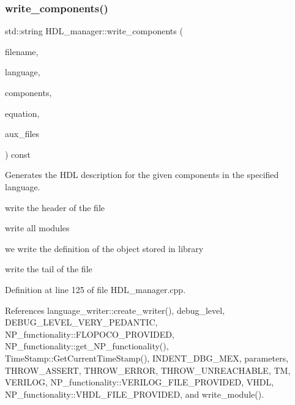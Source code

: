 \subsubsection{\texorpdfstring{write\+\_\+components()}{write\_components()}\hspace{0.1cm}{\footnotesize\ttfamily [1/2]}}
{\footnotesize\ttfamily std\+::string H\+D\+L\+\_\+manager\+::write\+\_\+components (\begin{DoxyParamCaption}\item[{const std\+::string \&}]{filename,  }\item[{const \hyperlink{language__writer_8hpp_a890069761ca3ce361c42684c789d886c}{H\+D\+L\+Writer\+\_\+\+Language}}]{language,  }\item[{const std\+::list$<$ \hyperlink{structural__objects_8hpp_a8ea5f8cc50ab8f4c31e2751074ff60b2}{structural\+\_\+object\+Ref} $>$ \&}]{components,  }\item[{bool}]{equation,  }\item[{std\+::list$<$ std\+::string $>$ \&}]{aux\+\_\+files }\end{DoxyParamCaption}) const\hspace{0.3cm}{\ttfamily [private]}}



Generates the H\+DL description for the given components in the specified language. 

write the header of the file

write all modules

we write the definition of the object stored in library

write the tail of the file 

Definition at line 125 of file H\+D\+L\+\_\+manager.\+cpp.



References language\+\_\+writer\+::create\+\_\+writer(), debug\+\_\+level, D\+E\+B\+U\+G\+\_\+\+L\+E\+V\+E\+L\+\_\+\+V\+E\+R\+Y\+\_\+\+P\+E\+D\+A\+N\+T\+IC, N\+P\+\_\+functionality\+::\+F\+L\+O\+P\+O\+C\+O\+\_\+\+P\+R\+O\+V\+I\+D\+ED, N\+P\+\_\+functionality\+::get\+\_\+\+N\+P\+\_\+functionality(), Time\+Stamp\+::\+Get\+Current\+Time\+Stamp(), I\+N\+D\+E\+N\+T\+\_\+\+D\+B\+G\+\_\+\+M\+EX, parameters, T\+H\+R\+O\+W\+\_\+\+A\+S\+S\+E\+RT, T\+H\+R\+O\+W\+\_\+\+E\+R\+R\+OR, T\+H\+R\+O\+W\+\_\+\+U\+N\+R\+E\+A\+C\+H\+A\+B\+LE, TM, V\+E\+R\+I\+L\+OG, N\+P\+\_\+functionality\+::\+V\+E\+R\+I\+L\+O\+G\+\_\+\+F\+I\+L\+E\+\_\+\+P\+R\+O\+V\+I\+D\+ED, V\+H\+DL, N\+P\+\_\+functionality\+::\+V\+H\+D\+L\+\_\+\+F\+I\+L\+E\+\_\+\+P\+R\+O\+V\+I\+D\+ED, and write\+\_\+module().




